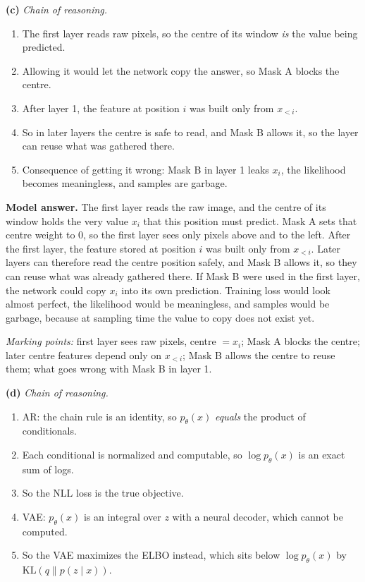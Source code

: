 \documentclass[12pt,a4paper]{article}
\begin{document}
\textbf{(c)} \emph{Chain of reasoning.}
\begin{enumerate}[nosep]
  \item The first layer reads raw pixels, so the centre of its window \emph{is} the value being predicted.
  \item Allowing it would let the network copy the answer, so Mask A blocks the centre.
  \item After layer 1, the feature at position $i$ was built only from $x_{<i}$.
  \item So in later layers the centre is safe to read, and Mask B allows it, so the layer can reuse what was gathered there.
  \item Consequence of getting it wrong: Mask B in layer 1 leaks $x_i$, the likelihood becomes meaningless, and samples are garbage.
\end{enumerate}

\textbf{Model answer.} The first layer reads the raw image, and the centre of its window holds the very value $x_i$ that this position must predict. Mask A sets that centre weight to 0, so the first layer sees only pixels above and to the left. After the first layer, the feature stored at position $i$ was built only from $x_{<i}$. Later layers can therefore read the centre position safely, and Mask B allows it, so they can reuse what was already gathered there. If Mask B were used in the first layer, the network could copy $x_i$ into its own prediction. Training loss would look almost perfect, the likelihood would be meaningless, and samples would be garbage, because at sampling time the value to copy does not exist yet.

\emph{Marking points:} first layer sees raw pixels, centre $=x_i$; Mask A blocks the centre; later centre features depend only on $x_{<i}$; Mask B allows the centre to reuse them; what goes wrong with Mask B in layer 1.

\textbf{(d)} \emph{Chain of reasoning.}
\begin{enumerate}[nosep]
  \item AR: the chain rule is an identity, so $p_\theta(x)$ \emph{equals} the product of conditionals.
  \item Each conditional is normalized and computable, so $\log p_\theta(x)$ is an exact sum of logs.
  \item So the NLL loss is the true objective.
  \item VAE: $p_\theta(x)$ is an integral over $z$ with a neural decoder, which cannot be computed.
  \item So the VAE maximizes the ELBO instead, which sits below $\log p_\theta(x)$ by $\mathrm{KL}(q\|p(z\mid x))$.
\end{enumerate}
\end{document}
